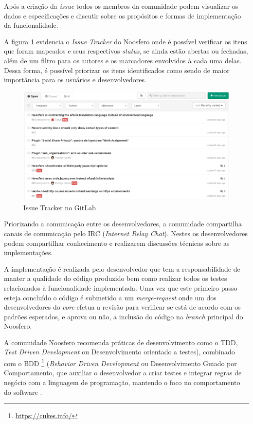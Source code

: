 Após a criação da \textit{issue} todos os membros da comunidade podem visualizar os dados e especificações e discutir sobre os propósitos e formas de implementação da funcionalidade.

A figura \ref{issue-tracker} evidencia o \textit{Issue Tracker} do Noosfero onde é possível verificar os itens que foram mapeados e seus respectivos \textit{status}, se ainda estão abertas ou fechadas, além de um filtro para os autores e os marcadores envolvidos à cada uma delas. Dessa forma, é possível priorizar os itens identificados como sendo de maior importância para os usuários e desenvolvedores.

\begin{figure}[h]
    \centering
    \includegraphics[keepaspectratio=true,scale=0.4]
      {figuras/issueTrackerGitLab.eps}
    \caption{Issue Tracker no GitLab}
    \label{issue-tracker}
\end{figure}

Priorizando a comunicação entre os desenvolvedores, a comunidade compartilha canais de comunicação pelo IRC (\textit{Internet Relay Chat}). Nestes os desenvolvedores podem compartilhar conhecimento e realizarem discussões técnicas sobre as implementações.

A implementação é realizada pelo desenvolvedor que tem a responsabilidade de manter a qualidade do código produzido bem como realizar todos os testes relacionados à funcionalidade implementada. Uma vez que este primeiro passo esteja concluído o código é submetido a um \textit{merge-request} onde um dos desenvolvedores do \textit{core} efetua a revisão para verificar se está de acordo com os padrões esperados, e aprova ou não, a inclusão do código na \textit{branch} principal do Noosfero.

A comunidade Noosfero recomenda práticas de desenvolvimento como o TDD, \textit{Test Driven Development} ou Desenvolvimento orientado a testes), combinado com o BDD \footnote{\url{https://cukes.info/}} (\textit{Behavior Driven Development} ou Desenvolvimento Guiado por Comportamento, que auxiliar o desenvolvedor a criar testes e integrar regras de negócio com a linguagem de programação, mantendo o foco no comportamento do software \cite{north2006introducing}.

